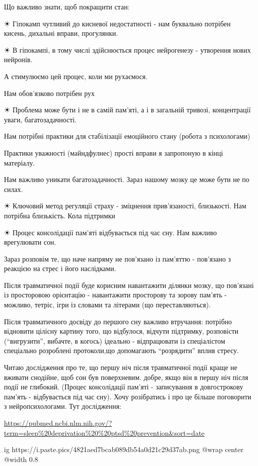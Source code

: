 Що важливо знати, щоб покращити стан:

☀ Гіпокамп чутливий до кисневої недостатності - нам буквально потрібен кисень,
дихальні вправи, прогулянки.

☀ В гіпокампі, в тому числі здійснюється процес нейрогенезу - утворення нових
нейронів.

А стимулюємо цей процес, коли ми рухаємося.

Нам обов'язково потрібен рух

☀ Проблема може бути і не в самій пам'яті, а і в загальній тривозі,
концентрації уваги, багатозадачності.

Нам потрібні практики для стабілізації емоційного стану (робота з психологами)

Практики уважності (майндфулнес) прості вправи я запропоную в кінці матеріалу.

Нам важливо уникати багатозадачності. Зараз нашому мозку це може бути не по
силах.

☀ Ключовий метод регуляції страху - зміцнення прив'язаності, близькості. Нам
потрібна близькість. Кола підтримки

☀ Процес консолідації пам'яті відбувається під час сну. Нам важливо врегулювати
сон.

Зараз розповім те, що наче напряму не пов'язано із пам'яттю - пов'язано з
реакцією на стрес і його наслідками.

Після травматичної події буде корисним навантажити ділянки мозку, що пов'язані
із просторовою орієнтацію - навантажити просторову та зорову пам'ять - можливо,
тетріс, ігри із словами та літерами (що переставляються).

Після травматичного досвіду до першого сну важливо втручання: потрібно
відновити цілісну картину того, що відбулося, відчути підтримку, розповісти
(\enquote{вигрузити}, вибачте, в когось) ідеально - відпрацювати із спеціалістом
спеціально розроблені протоколи,що допомагають \enquote{розрядити} вплив стресу.

Читаю дослідження про те, що першу ніч після травматичної події краще не
вживати снодійне, щоб сон був поверхневим. добре, якщо він в першу ніч після
події не глибокий. (Процес консолідації пам'яті - записування в довгострокову
пам'ять - відбувається під час сну). Хочу розібратись і про це більше
поговорити з нейропсихологами. Тут дослідження:

\url{https://pubmed.ncbi.nlm.nih.gov/?term=sleep%20deprivation%20%20ptsd%20prevention&sort=date}

\ifcmt
  ig https://i.paste.pics/4821aed7bcab089db54a0d21c29d37ab.png
  @wrap center
  @width 0.8
\fi


